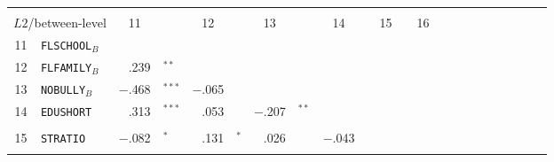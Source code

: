 {\begin{tabular}{cl r@{\hskip -0.1mm}l r@{\hskip -0.1mm}l r@{\hskip -0.1mm}l r@{\hskip -0.1mm}l r@{\hskip -0.1mm}l r@{\hskip -0.1mm}l r@{\hskip -0.1mm}l r@{\hskip -0.1mm}l r@{\hskip -0.1mm}l r@{\hskip -0.1mm}l}
                  &       &       &       &       &       &       &       &       &       &       &       &       &       &       &       &       &       &       &       &       &  \\
        \cmidrule[0.08em]{1-14}    \multicolumn{2}{c}{$L2$/between-level} & \multicolumn{1}{c}{11} &       & \multicolumn{1}{c}{12} &       & \multicolumn{1}{c}{13} &       & \multicolumn{1}{c}{14} &       & \multicolumn{1}{c}{15} &       & \multicolumn{1}{c}{16} &       &       &       &       &       &       &       &       &  \\
        \cmidrule[0.06em]{1-14}    11    & \texttt{FLSCHOOL}$_B$ &       &       &       &       &       &       &       &       &       &       &       &       &       &       &       &       &       &       &       &  \\
            12    & \texttt{FLFAMILY}$_B$ & \cellcolor[rgb]{ .765,  .765,  1}.239 & $^{**}$ &       &       &       &       &       &       &       &       &       &       &       &       &       &       &       &       &       &  \\
            13    & \texttt{NOBULLY}$_B$ & \cellcolor[rgb]{ 1,  .529,  .529}$-.$468 & $^{***}$ & \cellcolor[rgb]{ 1,  .933,  .933}$-.$065 &       &       &       &       &       &       &       &       &       &       &       &       &       &       &       &       &  \\
            14    & \texttt{EDUSHORT} & \cellcolor[rgb]{ .69,  .69,  1}.313 & $^{***}$ & \cellcolor[rgb]{ .949,  .949,  1}.053 &       & \cellcolor[rgb]{ 1,  .792,  .792}$-.$207 & $^{**}$ &       &       &       &       &       &       &       &       &       &       &       &       &       &  \\
                  &       &       &       &       &       &       &       &       &       &       &       &       &       &       &       &       &       &       &       &       &  \\
            15    & \texttt{STRATIO} & \cellcolor[rgb]{ 1,  .918,  .918}$-.$082 & $^*$ & \cellcolor[rgb]{ .871,  .871,  1}.131 & $^*$ & \cellcolor[rgb]{ .976,  .976,  1}.026 &       & \cellcolor[rgb]{ 1,  .957,  .957}$-.$043 &       &       &       &       &       &       &       &       &       &       &       &       &  \\
                  &       &       &       &       &       &       &       &       &       &       &       &       &       &       &       &       &       &       &       &       &  \\

\end{tabular}}
